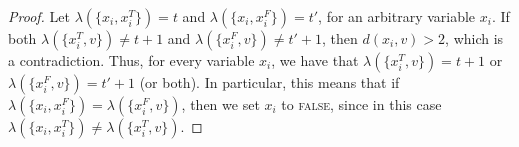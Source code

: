 \documentclass[a4paper,UKenglish,cleveref, autoref, thm-restate]{lipics-v2021}
\begin{document}
\begin{proof}
Let $\lambda(\{x_i, x_i^T\})=t$ and $\lambda(\{x_i, x_i^F\})=t'$, for an arbitrary variable $x_i$. 
If both $\lambda(\{x_i^T, v\})\neq t+1$ and $\lambda(\{x_i^F, v\})\neq t'+1$, then $d(x_i,v)>2$, which is a contradiction. 
Thus, for every variable $x_i$, we have that $\lambda(\{x_i^T, v\})= t+1$ or $\lambda(\{x_i^F, v\})= t'+1$ (or both). 
In particular, this means that if $\lambda(\{x_i, x_i^F\})=\lambda(\{x_i^F, v\})$, then we set $x_i$ to \textsc{false}, since in this case $\lambda(\{x_i, x_i^T\})\neq\lambda(\{x_i^T, v\})$.



\end{proof}
\end{document}
